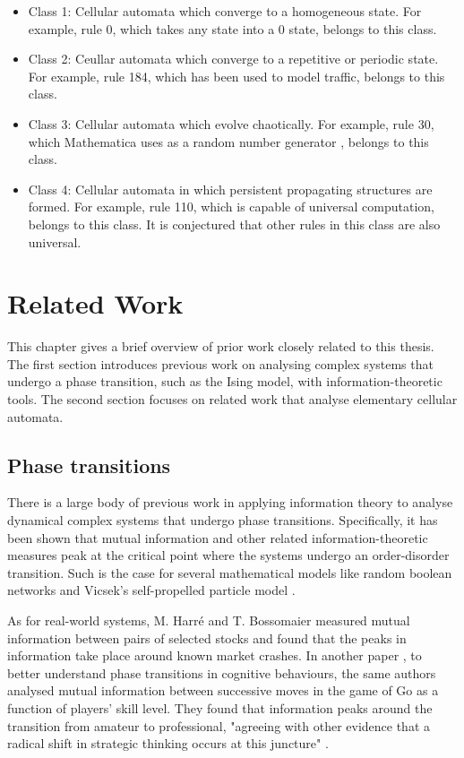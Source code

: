 \documentclass[12pt]{article}
\begin{document}
\begin{itemize}
\item Class 1: Cellular automata which converge to a homogeneous state. For example, rule 0, which takes any state into a 0 state, belongs to this class.
\item Class 2: Ceullar automata which converge to a repetitive or periodic state. For example, rule 184, which has been used to model traffic, belongs to this class.
\item Class 3: Cellular automata which evolve chaotically. For example, rule 30, which Mathematica uses as a random number generator \cite{NKS}, belongs to this class.
\item Class 4: Cellular automata in which persistent propagating structures are formed. For example, rule 110, which is capable of universal computation, belongs to this class. It is conjectured that other rules in this class are also universal. 
\end{itemize}

\newpage
\section{Related Work} 

This chapter gives a brief overview of prior work closely related to this thesis. The first section introduces previous work on analysing complex systems that undergo a phase transition, such as the Ising model, with information-theoretic tools. The second section focuses on related work that analyse elementary cellular automata.    

\subsection{Phase transitions}

There is a large body of previous work in applying information theory to analyse dynamical complex systems that undergo phase transitions. Specifically, it has been shown that mutual information and other related information-theoretic measures peak at the critical point where the systems undergo an order-disorder transition. Such is the case for several mathematical models like random boolean networks \cite{lizier-rand-bool-nets} and Vicsek's self-propelled particle model \cite{mi-swarms}. 

As for real-world systems, M. Harré and T. Bossomaier \cite{mi-financial-markets} measured mutual information between pairs of selected stocks and found that the peaks in information take place around known market crashes. In another paper \cite{mi-go}, to better understand phase transitions in cognitive behaviours, the same authors analysed mutual information between successive moves in the game of Go as a function of players' skill level. They found that information peaks around the transition from amateur to professional, "agreeing with other evidence that a radical shift in strategic thinking occurs at this juncture" \cite{mi-social-systems}. 
\end{document}
